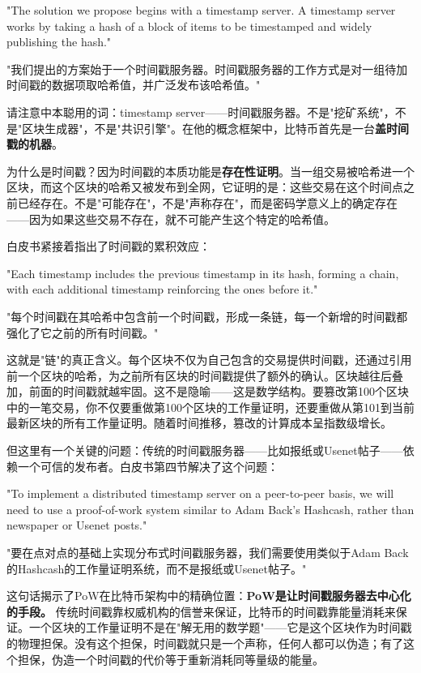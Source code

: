\documentclass[a4paper,12pt,openany]{ctexbook}
\newenvironment{quoting}{%
  \par\vspace{0.5em}%
  \begin{list}{}{%
    \setlength{\leftmargin}{2em}%
    \setlength{\rightmargin}{2em}%
    \setlength{\parsep}{0.3em}%
    \setlength{\itemsep}{0pt}%
    \setlength{\topsep}{0pt}%
  }%
  \item\relax
}{%
  \end{list}%
  \par\vspace{0.5em}%
}
\begin{document}
\begin{quoting}
\small
"The solution we propose begins with a timestamp server. A timestamp server works by taking a hash of a block of items to be timestamped and widely publishing the hash."

"我们提出的方案始于一个时间戳服务器。时间戳服务器的工作方式是对一组待加时间戳的数据项取哈希值，并广泛发布该哈希值。"
\end{quoting}


请注意中本聪用的词：timestamp server——时间戳服务器。不是"挖矿系统"，不是"区块生成器"，不是"共识引擎"。在他的概念框架中，比特币首先是一台\textbf{盖时间戳的机器}。

为什么是时间戳？因为时间戳的本质功能是\textbf{存在性证明}。当一组交易被哈希进一个区块，而这个区块的哈希又被发布到全网，它证明的是：这些交易在这个时间点之前已经存在。不是"可能存在"，不是"声称存在"，而是密码学意义上的确定存在——因为如果这些交易不存在，就不可能产生这个特定的哈希值。

白皮书紧接着指出了时间戳的累积效应：


\begin{quoting}
\small
"Each timestamp includes the previous timestamp in its hash, forming a chain, with each additional timestamp reinforcing the ones before it."

"每个时间戳在其哈希中包含前一个时间戳，形成一条链，每一个新增的时间戳都强化了它之前的所有时间戳。"
\end{quoting}


这就是"链"的真正含义。每个区块不仅为自己包含的交易提供时间戳，还通过引用前一个区块的哈希，为之前所有区块的时间戳提供了额外的确认。区块越往后叠加，前面的时间戳就越牢固。这不是隐喻——这是数学结构。要篡改第100个区块中的一笔交易，你不仅要重做第100个区块的工作量证明，还要重做从第101到当前最新区块的所有工作量证明。随着时间推移，篡改的计算成本呈指数级增长。

但这里有一个关键的问题：传统的时间戳服务器——比如报纸或Usenet帖子——依赖一个可信的发布者。白皮书第四节解决了这个问题：


\begin{quoting}
\small
"To implement a distributed timestamp server on a peer-to-peer basis, we will need to use a proof-of-work system similar to Adam Back's Hashcash, rather than newspaper or Usenet posts."

"要在点对点的基础上实现分布式时间戳服务器，我们需要使用类似于Adam Back的Hashcash的工作量证明系统，而不是报纸或Usenet帖子。"
\end{quoting}


这句话揭示了PoW在比特币架构中的精确位置：\textbf{PoW是让时间戳服务器去中心化的手段。} 传统时间戳靠权威机构的信誉来保证，比特币的时间戳靠能量消耗来保证。一个区块的工作量证明不是在"解无用的数学题"——它是这个区块作为时间戳的物理担保。没有这个担保，时间戳就只是一个声称，任何人都可以伪造；有了这个担保，伪造一个时间戳的代价等于重新消耗同等量级的能量。
\end{document}

